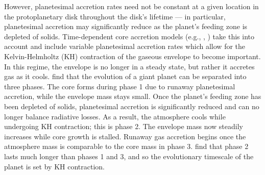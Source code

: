 \documentclass[apj]{emulateapj}
\begin{document}

However, planetesimal accretion rates need not be constant at a given location in the protoplanetary disk throughout the disk's lifetime --- in particular, planetesimal accretion may significantly reduce as the planet's feeding zone is depleted of solids. Time-dependent core accretion models (e.g., \citealt{pollack96}, \citealt{ikoma00}) take this into account and include variable planetesimal accretion rates which allow for the Kelvin-Helmholtz (KH) contraction of the gaseous envelope to become important. In this regime, the envelope is no longer in a steady state, but rather it accretes gas as it cools. \citet{pollack96} find that the evolution of a giant planet can be separated into three phases. The core forms during phase 1 due to runaway planetesimal accretion, while the envelope mass stays small. Once the planet's feeding zone has been depleted of solids, planetesimal accretion is significantly reduced and can no longer balance radiative losses. As a result, the atmosphere cools while undergoing KH contraction; this is phase 2. The envelope mass now steadily increases while core growth is stalled. Runaway gas accretion begins once the atmosphere mass is comparable to the core mass in phase 3. \citet{pollack96} find that phase 2 lasts much longer than phases 1 and 3, and so the evolutionary timescale of the planet is set by KH contraction. %



\end{document}

